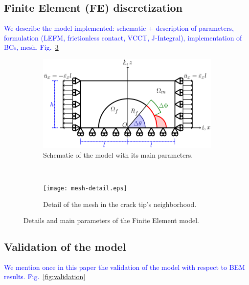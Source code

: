 \documentclass[review]{elsarticle}
\begin{document}
\subsection{Finite Element (FE) discretization}

\textcolor{blue}{We describe the model implemented: schematic + description of parameters, formulation (LEFM, frictionless contact, VCCT, J-Integral), implementation of BCs, mesh. Fig.~\ref{fig:FEmodel}}

\begin{figure}[!h]
\centering
    \begin{subfigure}[b]{0.55\textwidth}
        \includegraphics[width=\textwidth]{RUC.pdf}
        \caption{Schematic of the model with its main parameters.}\label{subfig:modelschem}
    \end{subfigure} ~
    \begin{subfigure}[b]{0.4\textwidth}
        \texttt{[image: mesh-detail.eps]}
        \caption{Detail of the mesh in the crack tip's neighborhood.}\label{subfig:meshdetail}
    \end{subfigure}

\caption{Details and main parameters of the Finite Element model.}\label{fig:FEmodel}
\end{figure}

\subsection{Validation of the model}

\textcolor{blue}{We mention once in this paper the validation of the model with respect to BEM results. Fig.~\ref{fig:validation}}
\end{document}
